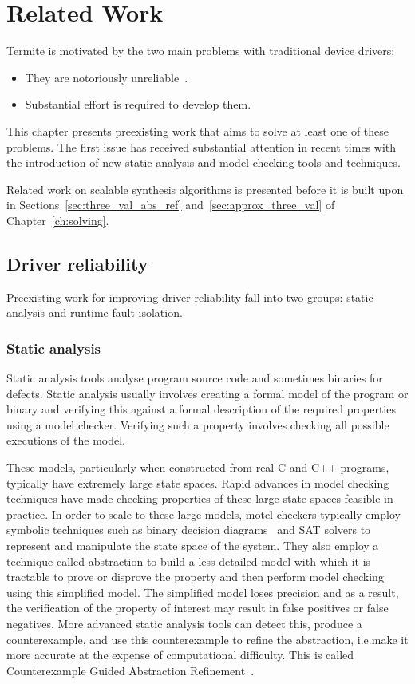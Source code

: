 \chapter{Related Work}
\label{ch:related}

Termite is motivated by the two main problems with traditional device drivers:

\begin{itemize}
    \item They are notoriously unreliable~\cite{Chou_YCHE_01,Ganapathi_GP_06}.
    \item Substantial effort is required to develop them.
\end{itemize}

This chapter presents preexisting work that aims to solve at least one of these problems. The first issue has received substantial attention in recent times with the introduction of new static analysis and model checking tools and techniques. 

Related work on scalable synthesis algorithms is presented before it is built upon in Sections~\ref{sec:three_val_abs_ref} and~\ref{sec:approx_three_val} of Chapter~\ref{ch:solving}.

\section{Driver reliability}
Preexisting work for improving driver reliability fall into two groups: static analysis and runtime fault isolation.

\subsection{Static analysis}
Static analysis tools analyse program source code and sometimes binaries for defects. Static analysis usually involves creating a formal model of the program or binary and verifying this against a formal description of the required properties using a model checker. Verifying such a property involves checking all possible executions of the model.

These models, particularly when constructed from real C and C++ programs, typically have extremely large state spaces. Rapid advances in model checking techniques have made checking properties of these large state spaces feasible in practice. In order to scale to these large models, motel checkers typically employ symbolic techniques such as binary decision diagrams~\cite{Bryant_86} and SAT solvers to represent and manipulate the state space of the system. They also employ a technique called abstraction to build a less detailed model with which it is tractable to prove or disprove the property and then perform model checking using this simplified model. The simplified model loses precision and as a result, the verification of the property of interest may result in false positives or false negatives. More advanced static analysis tools can detect this, produce a counterexample, and use this counterexample to refine the abstraction, i.e.\@ make it more accurate at the expense of computational difficulty. This is called Counterexample Guided Abstraction Refinement~\cite{Clarke_GJLV_00}.

